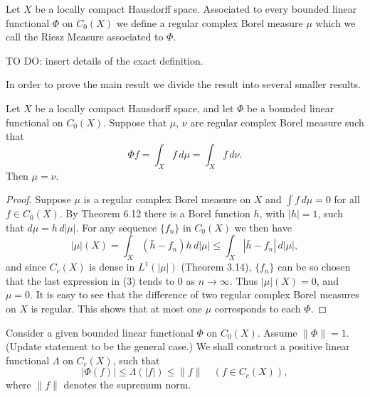 \begin{definition}
  \label{def:riesz_measure}
  \notready
  Let $X$ be a locally compact Hausdorff space.
  Associated to every bounded linear functional $\Phi$ on $C_0(X)$ we define a regular complex Borel measure $\mu$ which we call the Riesz Measure associated to $\Phi$.

  TO DO: insert details of the exact definition.
\end{definition}

In order to prove the main result we divide the result into several smaller results.

\begin{lemma}
  \label{lem:unique}
  Let $X$ be a locally compact Hausdorff space, and let $\Phi$ be a bounded linear functional on $C_0(X)$.
  Suppose that $\mu$, $\nu$ are regular complex Borel measure such that
  \begin{equation*}
    \Phi f = \int_X f \, d\mu = \int_X f \, d\nu.
  \end{equation*}
  Then \(\mu = \nu\).
\end{lemma}

\begin{proof}
  Suppose $\mu$ is a regular complex Borel measure on $X$ and $\int f \, d\mu = 0$ for all $f \in C_0(X)$. By Theorem 6.12 there is a Borel function $h$, with $|h| = 1$, such that $d\mu = h \, d|\mu|$.
  For any sequence $\{f_n\}$ in $C_0(X)$ we then have
  \begin{equation}
    |\mu|(X) = \int_X (\bar{h} - f_n)h \, d|\mu| \leq \int_X |\bar{h} - f_n| \, d|\mu|, \tag{3}
  \end{equation}
  and since $C_c(X)$ is dense in $L^1(|\mu|)$ (Theorem 3.14), $\{f_n\}$ can be so chosen that the last expression in (3) tends to 0 as $n \to \infty$. Thus $|\mu|(X) = 0$, and $\mu = 0$.
  It is easy to see that the difference of two regular complex Borel measures on $X$ is regular.
  This shows that at most one $\mu$ corresponds to each $\Phi$.
\end{proof}


\begin{lemma}
  \label{lem:exists_pos_lin_func}
  Consider a given bounded linear functional $\Phi$ on $C_0(X)$.
  Assume $\|\Phi\| = 1$. (Update statement to be the general case.)
  We shall construct a positive linear functional $\Lambda$ on $C_c(X)$, such that
  \begin{equation}
    |\Phi(f)| \leq \Lambda(|f|) \leq \|f\| \quad (f \in C_c(X)), \tag{4}
  \end{equation}
  where $\|f\|$ denotes the supremum norm.
\end{lemma}

